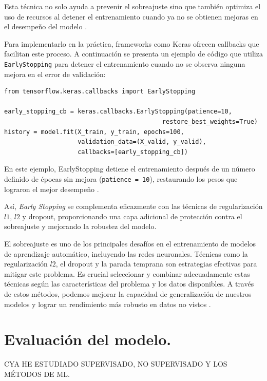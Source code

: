 Esta técnica no solo ayuda a prevenir el sobreajuste sino que también optimiza el uso de recursos al detener el entrenamiento cuando ya no se obtienen mejoras en el desempeño del modelo \citep{tian2022comprehensive}.

Para implementarlo en la práctica, frameworks como Keras ofrecen callbacks que facilitan este proceso. A continuación se presenta un ejemplo de código que utiliza \lstinline|EarlyStopping| para detener el entrenamiento cuando no se observa ninguna mejora en el error de validación:


\lstset{language=Python}
\begin{lstlisting}
from tensorflow.keras.callbacks import EarlyStopping

early_stopping_cb = keras.callbacks.EarlyStopping(patience=10,
                                           restore_best_weights=True)
history = model.fit(X_train, y_train, epochs=100,
                    validation_data=(X_valid, y_valid),
                    callbacks=[early_stopping_cb])
\end{lstlisting}

En este ejemplo, EarlyStopping detiene el entrenamiento después de un número definido de épocas sin mejora (\lstinline|patience = 10|), restaurando los pesos que lograron el mejor desempeño \citep{geron2022hands}.

Así, \textit{Early Stopping} se complementa eficazmente con las técnicas de regularización $l1$, $l2$ y dropout, proporcionando una capa adicional de protección contra el sobreajuste y mejorando la robustez del modelo.

\bigskip


El sobreajuste es uno de los principales desafíos en el entrenamiento de modelos de aprendizaje automático, incluyendo las redes neuronales. Técnicas como la regularización \(l2\), el dropout y la parada temprana son estrategias efectivas para mitigar este problema. Es crucial seleccionar y combinar adecuadamente estas técnicas según las características del problema y los datos disponibles. A través de estos métodos, podemos mejorar la capacidad de generalización de nuestros modelos y lograr un rendimiento más robusto en datos no vistos \citep{geron2022hands, pajares2021aprendizaje}.












\section{Evaluación del modelo.} CYA HE ESTUDIADO SUPERVISADO, NO SUPERVISADO Y LOS MÉTODOS DE ML.



